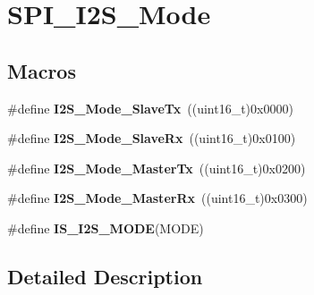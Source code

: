\hypertarget{group___s_p_i___i2_s___mode}{\section{S\-P\-I\-\_\-\-I2\-S\-\_\-\-Mode}
\label{group___s_p_i___i2_s___mode}
}
\subsection*{Macros}
\begin{DoxyCompactItemize}
\item 
\hypertarget{group___s_p_i___i2_s___mode_gadd5b20277198fcdb6aa53ea48e802ae5}{\#define {\bfseries I2\-S\-\_\-\-Mode\-\_\-\-Slave\-Tx}~((uint16\-\_\-t)0x0000)}\label{group___s_p_i___i2_s___mode_gadd5b20277198fcdb6aa53ea48e802ae5}

\item 
\hypertarget{group___s_p_i___i2_s___mode_gaaf62ee0353476afc9612dc2933e1c5c5}{\#define {\bfseries I2\-S\-\_\-\-Mode\-\_\-\-Slave\-Rx}~((uint16\-\_\-t)0x0100)}\label{group___s_p_i___i2_s___mode_gaaf62ee0353476afc9612dc2933e1c5c5}

\item 
\hypertarget{group___s_p_i___i2_s___mode_ga3a62ee8964033a3f6fd030da9e40fba6}{\#define {\bfseries I2\-S\-\_\-\-Mode\-\_\-\-Master\-Tx}~((uint16\-\_\-t)0x0200)}\label{group___s_p_i___i2_s___mode_ga3a62ee8964033a3f6fd030da9e40fba6}

\item 
\hypertarget{group___s_p_i___i2_s___mode_gabf9f872cda7c0f159c5fc18aed44e973}{\#define {\bfseries I2\-S\-\_\-\-Mode\-\_\-\-Master\-Rx}~((uint16\-\_\-t)0x0300)}\label{group___s_p_i___i2_s___mode_gabf9f872cda7c0f159c5fc18aed44e973}

\item 
\#define {\bfseries I\-S\-\_\-\-I2\-S\-\_\-\-M\-O\-D\-E}(M\-O\-D\-E)
\end{DoxyCompactItemize}


\subsection{Detailed Description}


